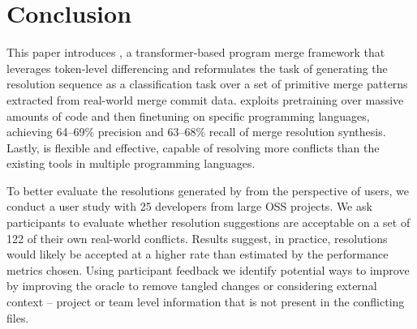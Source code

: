 \section{Conclusion}
\balance
This paper introduces \thistool{}, a transformer-based program merge framework that leverages token-level differencing and reformulates the task of generating the resolution sequence as a classification task over a set of primitive merge patterns extracted from real-world merge commit data. \thistool{} exploits pretraining over massive amounts of code and then finetuning on specific programming languages, achieving 64--69\% precision and 63--68\% recall of merge resolution synthesis.  Lastly, \thistool{} is flexible and effective, capable of resolving more conflicts than the existing tools in multiple programming languages.

To better evaluate the resolutions generated by \thistool{} from the perspective of users, we conduct a user study with 25 developers from large OSS projects. We ask participants to evaluate whether \thistool{} resolution suggestions are acceptable on a set of 122 of their own real-world conflicts. Results suggest, in practice, \thistool{}  resolutions would likely be accepted at a higher rate than estimated by the performance metrics chosen. Using participant feedback we identify potential ways to improve \thistool{} by improving the oracle to remove tangled changes or considering external context -- project or team level information that is not present in the conflicting files. 

